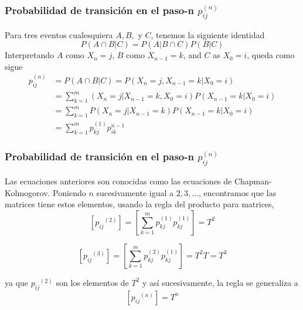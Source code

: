 \documentclass[spanish]{beamer}
\begin{document}

\begin{frame}
\frametitle{Probabilidad de transición en el paso-n $p_{ij}^{(n)}$}
Para tres eventos cualesquiera $A,B,$ y $C$, tenemos la siguiente identidad 
\begin{equation*}
P(A \cap B \vert C) = P(A \vert B \cap C) P(B \vert C) 
\end{equation*} 
Interpretando $A$ como $X_n = j$, $B$ como $X_{n-1} = k$, and $C$ as $X_{0} = i$, queda como sigue 
\small
\begin{align*} 
p_{ij}^{(n)}& = P(A \cap B \vert C) = P(X_{n}=j, X_{n-1}=k \vert X_{0}=i) \\
& =\sum_{k=1}^{m}
(X_{n}=j\vert X_{n-1}=k,  X_{0}=i) P(X_{n-1}=k \vert X_{0}=i)\\
& =\sum_{k=1}^{m}P(X_{n}=j\vert X_{n-1}=k) P(X_{n-1}=k \vert X_{0}=i)\\
& =\sum_{k=1}^{m} p_{kj}^{(1)}p_{ik}^{n-1}
\end{align*}

\end{frame}


\begin{frame}
\frametitle{Probabilidad de transición en el paso-n $p_{ij}^{(n)}$}
Las ecuaciones anteriores son conocidas como las ecuaciones de  Chapman-Kolmogorov. Poniendo $n$ sucesivamente igual a $2, 3, \ldots$, encontramos que las matrices tiene estos elementos, usando la regla del producto para matrices, 
\begin{equation*}
\left[ {p_{ij}}^{(2)} \right] = \left[ \sum_{k=1}^{m} p_{kj}^{(1)}p_{kj}^{(1)} \right] =  T^2
\end{equation*} 

\begin{equation*}
\left[ {p_{ij}}^{(3)} \right] = \left[ \sum_{k=1}^{m} p_{kj}^{(2)}p_{kj}^{(1)} \right] =  T^2T=T^3
\end{equation*}

ya que ${p_{ij}}^{(2)} $ son los elementos de $T^2$ y así sucesivamente, la regla se generaliza a 
\begin{equation*}
\left[ {p_{ij}}^{(n)} \right]=T^n
\end{equation*}
\end{frame}

\end{document}

